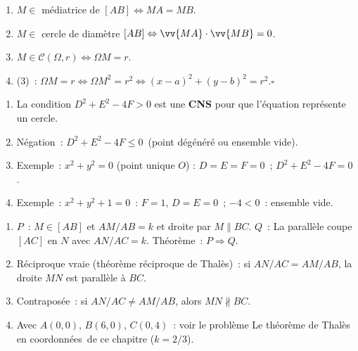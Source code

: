 
\begin{enumerate}
  \item $M\in$ m\'ediatrice de $[AB]\Leftrightarrow MA=MB$.
  \item $M\in$ cercle de diam\`etre $[AB]\Leftrightarrow\vv{MA}\cdot\vv{MB}=0$.
  \item $M\in\mathcal{C}(\Omega,r)\Leftrightarrow\Omega M=r$.
  \item (3)~: $\Omega M=r\Leftrightarrow\Omega M^2=r^2\Leftrightarrow(x-a)^2+(y-b)^2=r^2$.\hfill$\square$
\end{enumerate}


\begin{enumerate}
  \item La condition $D^2+E^2-4F>0$ est une \textbf{CNS} pour que l'\'equation repr\'esente un cercle.
  \item N\'egation~: \og $D^2+E^2-4F\leq0$\fg\ (point d\'eg\'en\'er\'e ou ensemble vide).
  \item Exemple~: $x^2+y^2=0$ (point unique $O$) : $D=E=F=0$~; $D^2+E^2-4F=0$.
  \item Exemple~: $x^2+y^2+1=0$~: $F=1$, $D=E=0$~; $-4<0$~: ensemble vide.
\end{enumerate}


\begin{enumerate}
  \item $P$~: \og $M\in[AB]$ et $AM/AB=k$ et droite par $M\parallel BC$\fg.
        $Q$~: \og La parallèle coupe $[AC]$ en $N$ avec $AN/AC=k$.\fg
        Th\'eor\`eme~: $P\Rightarrow Q$.
  \item R\'eciproque vraie (th\'eor\`eme r\'eciproque de Thal\`es)~:
        si $AN/AC=AM/AB$, la droite $MN$ est parall\`ele \`a $BC$.
  \item Contrapos\'ee~: si $AN/AC\ne AM/AB$, alors $MN\not\parallel BC$.
  \item Avec $A(0,0)$, $B(6,0)$, $C(0,4)$~: voir le probl\`eme \og Le th\'eor\`eme de Thal\`es en coordonn\'ees\fg\ de ce chapitre ($k=2/3$).
\end{enumerate}

